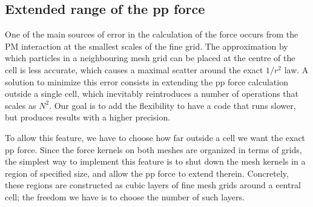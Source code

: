 \documentclass[useAMS,usenatbib]{mn2e}
\begin{document}
\subsection{Extended range of the pp force}
\label{subsec:extendedpp} 

One of the main sources of error in the calculation of the force occurs from the PM interaction at the smallest scales of the fine grid.
The approximation by which particles in a neighbouring mesh grid can be placed at the centre of the cell
is less accurate, which causes a maximal scatter around the exact $1/r^2$ law.
A solution to minimize this error consists in extending the pp force calculation outside a single cell,
which inevitably reintroduces a number of operations that scales as $N^2$. 
Our goal is to add the flexibility to have a code that runs slower, but produces results with a higher precision. 

To allow this feature, we  have to choose how far outside a cell we want the exact pp force.  
Since the force kernels on both meshes are organized in terms of grids, the simplest way to implement this 
feature is to shut down the mesh kernels in a region of specified size, and allow the pp force to extend therein.
Concretely, these regions are constructed as cubic layers of fine mesh grids around a central cell; 
the freedom we have is to choose the number of such layers.
 
\end{document}
